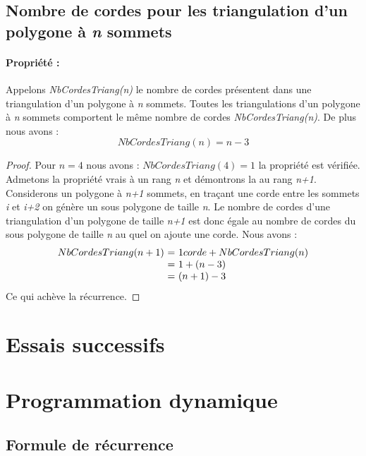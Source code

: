 \documentclass[a4paper,10pt]{article}
\begin{document}
\subsection{Nombre de cordes pour les triangulation d'un polygone à \emph{n} sommets}

\paragraph{Propriété :}  
Appelons \emph{NbCordesTriang(n)} le nombre de cordes présentent dans une triangulation d'un polygone à \emph{n} sommets.
Toutes les triangulations d'un polygone à \emph{n} sommets comportent le même nombre de cordes \emph{NbCordesTriang(n)}.
De plus nous avons :
\begin{equation} 
NbCordesTriang(n) = n-3
\end{equation}

\begin{proof}
Pour \(n = 4\) nous avons : \(NbCordesTriang(4) = 1 \) la propriété est vérifiée. \\
Admetons la propriété vrais à un rang \emph{n} et démontrons la au rang \emph{n+1}. \\
Considerons un polygone à \emph{n+1} sommets, en traçant une corde entre les sommets \emph{i} et \emph{i+2} on génère un sous polygone de taille \emph{n}.
Le nombre de cordes d'une triangulation d'un polygone de taille \emph{n+1} est donc égale au nombre de cordes du sous polygone de taille \emph{n} au quel on ajoute une corde.
Nous avons :\\
\[
\begin{array}{r @{=} l}
NbCordesTriang(n+1) \ & \  1 corde + NbCordesTriang(n) \\
			  & \ 1 + (n-3) \\
			  & \ (n+1) - 3
\end{array}
\]
Ce qui achève la récurrence.
\end{proof}


\section{Essais successifs}

\section{Programmation dynamique}

\subsection{Formule de récurrence}
\end{document}
